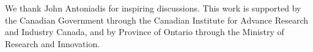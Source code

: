 \documentclass[aps,showpacs,twocolumn,floats,prd,superscriptaddress,nofootinbib]{revtex4}
\begin{document}
\acknowledgments

We thank John Antoniadis for inspiring discussions. This work is supported by the Canadian Government through the Canadian Institute for Advance Research and Industry Canada, and by Province of Ontario through the Ministry of Research and Innovation.

\appendix

%

\end{document}
